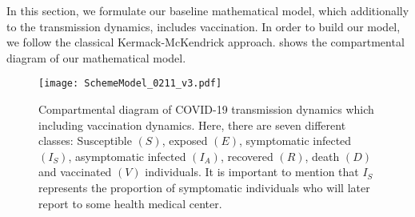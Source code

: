 
In this section, we formulate our baseline mathematical model,
which additionally to the transmission dynamics, includes vaccination.
In order to build our  model, we follow the classical Kermack-McKendrick
approach.  shows the compartmental diagram of
our mathematical model.
\begin{figure*}[tbh]
    \centering
    \texttt{[image: SchemeModel\_0211\_v3.pdf]}
    \caption{%
        Compartmental diagram of COVID-19 transmission dynamics which
        including vaccination dynamics. Here, there are seven different classes:
        Susceptible $(S)$, exposed $(E)$, symptomatic infected $(I_S)$, asymptomatic
        infected $(I_A)$, recovered $(R)$, death $(D)$ and vaccinated $(V)$
        individuals. It is important to mention that $I_{S}$ represents the
        proportion of symptomatic individuals who will later report
        to some health medical center.}
    \label{Fig:SchemeModel}
\end{figure*}

